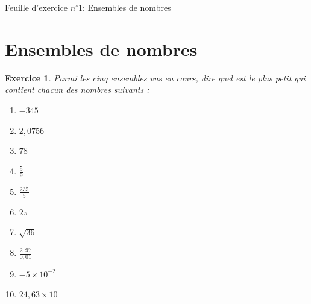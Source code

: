 \documentclass[10pt,a4paper]{article}
\title{}
\makeatletter
\newtheorem{exo}{Exercice}
\newlength{\longA}
\newlength{\longB}
\newenvironment{BoiteShadow}[3][\linewidth]{%
\addtolength{\longA}{#2}
\addtolength{\longB}{#3}
\begin{Sbox}\begin{minipage}{#1}}%
{\end{minipage}\end{Sbox}%
\setlength{\fboxsep}{\longA}
\setlength{\shadowsize}{\longB}
\shadowbox{\unhbox\@Sbox}\par}
\makeatother
\begin{document}
\begin{BoiteShadow}{10pt}{8pt}
\Huge{Feuille d'exercice $n^{\circ}1$: Ensembles de nombres}
 \end{BoiteShadow}


\section{Ensembles de nombres}

\begin{exo}
    Parmi les cinq ensembles vus en cours, dire quel est le plus petit qui contient chacun des nombres suivants :
    \begin{enumerate}
        \item $-345$
        \item $2,0756$
        \item $78$
        \item $\frac{5}{9}$
        \item $\frac{235}{5}$
        \item $2\pi$
        \item $\sqrt{36}$
        \item $\frac{2,97}{0,01}$
        \item $-5 \times 10^{-2}$
        \item $24,63 \times 10$
    \end{enumerate}
\end{exo}
\end{document}

